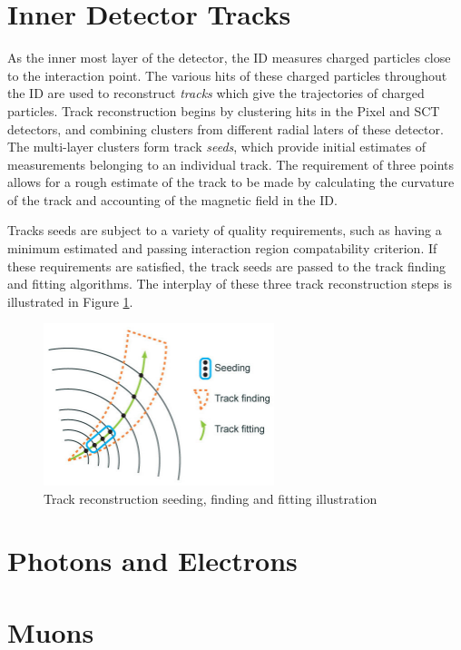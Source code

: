 \section{Inner Detector Tracks}
As the inner most layer of the detector, the ID measures charged particles close to the interaction point. The various hits of these charged particles throughout the ID are used to reconstruct \textit{tracks} which give the trajectories of charged particles. Track reconstruction begins by clustering hits in the Pixel and SCT detectors, and combining clusters from different radial laters of these detector. The multi-layer clusters form track \textit{seeds}, which provide initial estimates of measurements belonging to an individual track. The requirement of three points allows for a rough estimate of the track \pt to be made by calculating the curvature of the track and accounting of the magnetic field in the ID. \par

Tracks seeds are subject to a variety of quality requirements, such as having a minimum estimated \pt and passing interaction region compatability criterion. If these requirements are satisfied, the track seeds are passed to the track finding and fitting algorithms. The interplay of these three track reconstruction steps is illustrated in Figure \ref{fig:track_reco}. 

\begin{figure}
        \centering
	\includegraphics[width=0.6\textwidth]{figures/ch5/track_reco}
	\caption{Track reconstruction seeding, finding and fitting illustration \cite{track_finding}}
	\label{fig:track_reco}
\end{figure}


\section{Photons and Electrons}
\section{Muons}
